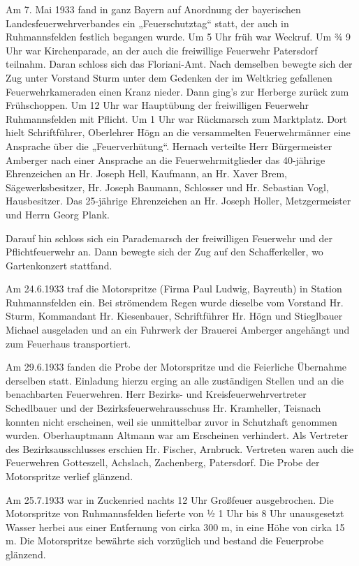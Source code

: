 \documentclass[12pt,a4paper]{book}
\begin{document}
Am 7. Mai 1933 fand in ganz Bayern auf Anordnung der bayerischen
Landesfeuerwehrverbandes ein „Feuerschutztag“ statt, der auch in Ruhmannsfelden
festlich begangen wurde. Um 5 Uhr früh war Weckruf. Um ¾ 9 Uhr war
Kirchenparade, an der auch die freiwillige Feuerwehr Patersdorf teilnahm. Daran
schloss sich das Floriani-Amt. Nach demselben bewegte sich der Zug unter
Vorstand Sturm unter dem Gedenken der im Weltkrieg gefallenen Feuerwehrkameraden
einen Kranz nieder. Dann ging’s zur Herberge zurück zum Frühschoppen. Um 12 Uhr
war Hauptübung der freiwilligen Feuerwehr Ruhmannsfelden mit Pflicht. Um 1 Uhr
war Rückmarsch zum Marktplatz. Dort hielt Schriftführer, Oberlehrer Högn an die
versammelten Feuerwehrmänner eine Ansprache über die „Feuerverhütung“. Hernach
verteilte Herr Bürgermeister Amberger nach einer Ansprache an die
Feuerwehrmitglieder das 40-jährige Ehrenzeichen an Hr. Joseph Hell, Kaufmann, an
Hr. Xaver Brem, Sägewerksbesitzer, Hr. Joseph Baumann, Schlosser und Hr.
Sebastian Vogl, Hausbesitzer. Das 25-jährige Ehrenzeichen an Hr. Joseph Holler,
Metzgermeister und Herrn Georg Plank.

Darauf hin schloss sich ein Parademarsch der freiwilligen Feuerwehr und der
Pflichtfeuerwehr an. Dann bewegte sich der Zug auf den Schafferkeller, wo
Gartenkonzert stattfand.

Am 24.6.1933 traf die Motorspritze (Firma Paul Ludwig, Bayreuth) in Station
Ruhmannsfelden ein. Bei strömendem Regen wurde dieselbe vom Vorstand Hr. Sturm,
Kommandant Hr. Kiesenbauer, Schriftführer Hr. Högn und Stieglbauer Michael
ausgeladen und an ein Fuhrwerk der Brauerei Amberger angehängt und zum Feuerhaus
transportiert.

Am 29.6.1933 fanden die Probe der Motorspritze und die Feierliche Übernahme
derselben statt. Einladung hierzu erging an alle zuständigen Stellen und an die
benachbarten Feuerwehren. Herr Bezirks- und Kreisfeuerwehrvertreter Schedlbauer
und der Bezirksfeuerwehrausschuss Hr. Kramheller, Teisnach konnten nicht
erscheinen, weil sie unmittelbar zuvor in Schutzhaft genommen wurden.
Oberhauptmann Altmann war am Erscheinen verhindert. Als Vertreter des
Bezirksausschlusses erschien Hr. Fischer, Arnbruck. Vertreten waren auch die
Feuerwehren Gotteszell, Achslach, Zachenberg, Patersdorf. Die Probe der
Motorspritze verlief glänzend.

Am 25.7.1933 war in Zuckenried nachts 12 Uhr Großfeuer ausgebrochen. Die
Motorspritze von Ruhmannsfelden lieferte von ½ 1 Uhr bis 8 Uhr unausgesetzt
Wasser herbei aus einer Entfernung von cirka 300 m, in eine Höhe von cirka 15 m.
Die Motorspritze bewährte sich vorzüglich und bestand die Feuerprobe glänzend.
\end{document}
